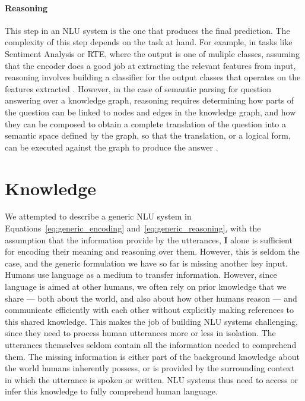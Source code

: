 \paragraph{Reasoning} This step in an NLU system is the one that produces the final prediction. The
complexity of this step depends on the task at hand.  For example, in tasks like Sentiment Analysis
or RTE, where the output is one of muliple classes, assuming that the encoder does a good job at
extracting the relevant features from input, reasoning involves building a classifier for the output
classes that operates on the features extracted \citep{pang2002thumbs}. However, in the case of
semantic parsing for question answering over a knowledge graph, reasoning requires determining how
parts of the question can be linked to nodes and edges in the knowledge graph, and how they can be
composed to obtain a complete translation of the question into a semantic space defined by the
graph, so that the translation, or a logical form, can be executed against the graph to produce the
answer \citep{Zettlemoyer2005LearningTM}.

\section{Knowledge}\label{sec:intro_external_knowledge} We attempted to describe a generic NLU
system in Equations~\ref{eq:generic_encoding} and~\ref{eq:generic_reasoning}, with the assumption
that the information provide by the utterances, $\textbf{I}$ alone is sufficient for encoding their
meaning and reasoning over them. However, this is seldom the case, and the generic formulation we
have so far is missing another key input.  Humans use language as a medium to transfer information.
However, since language is aimed at other humans, we often rely on prior knowledge that we share ---
both about the world, and also about how other humans reason --- and communicate efficiently with
each other without explicitly making references to this shared knowledge. This makes the job of
building NLU systems challenging, since they need to process human utterances more or less in
isolation. The utterances themselves seldom contain all the information needed to comprehend them.
The missing information is either part of the background knowledge about the world humans inherently
possess, or is provided by the surrounding context in which the utterance is spoken or written. NLU
systems thus need to access or infer this knowledge to fully comprehend human language.

